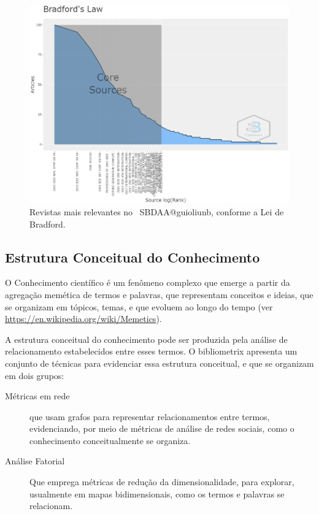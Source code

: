 \begin{figure}
    \centering
    \includegraphics[width=1\textwidth]{experiments/guioliunb/AnaliseBibliometrica/SocialBigDataAnalysis/BRADFORDS LAW.png}
    \caption{Revistas mais relevantes no  \dataset\ SBDAA@guioliunb, conforme a Lei de Bradford.}
    \label{fig:MASSA2-Bradfords-Law.png}
\end{figure}



\subsection{Estrutura Conceitual do Conhecimento}

O Conhecimento científico é um fenômeno complexo que emerge a partir da agregação memética de termos e palavras, que representam conceitos e ideias, que se organizam em tópicos, temas, e que evoluem ao longo do tempo (ver \url{https://en.wikipedia.org/wiki/Memetics}).

A estrutura conceitual do conhecimento pode ser produzida pela análise de relacionamento estabelecidos entre esses termos. O bibliometrix apresenta um conjunto de técnicas para evidenciar essa estrutura conceitual, e que se organizam em dois grupos:
\begin{description}
    \item [Métricas em rede] que usam grafos para representar relacionamentos entre termos, evidenciando, por meio de métricas de análise de redes sociais, como o conhecimento conceitualmente se organiza.
    \item [Análise Fatorial] Que emprega métricas de redução da dimensionalidade, para explorar, usualmente em mapas bidimensionais, como os termos e palavras se relacionam. 
\end{description}

